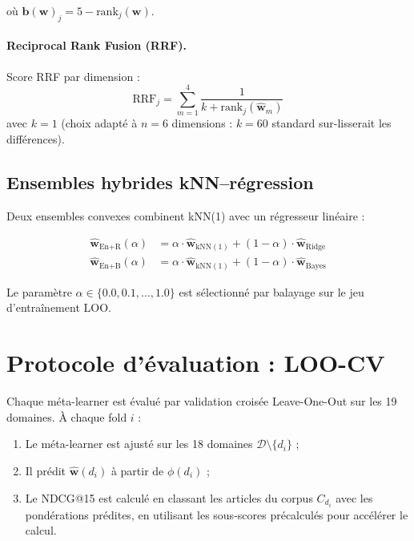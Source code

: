 où $\mathbf{b}(\mathbf{w})_j = 5 - \text{rank}_j(\mathbf{w})$.

\paragraph{Reciprocal Rank Fusion (RRF).} Score RRF par dimension :
\begin{equation}
  \text{RRF}_j = \sum_{m=1}^{4} \frac{1}{k + \text{rank}_j(\hat{\mathbf{w}}_m)}
  \label{eq:rrf}
\end{equation}
avec $k = 1$ (choix adapté à $n = 6$ dimensions : $k = 60$ standard
sur-lisserait les différences).

\subsection{Ensembles hybrides kNN--régression}

Deux ensembles convexes combinent kNN(1) avec un régresseur linéaire :

\begin{align}
  \hat{\mathbf{w}}_{\text{En+R}}(\alpha) &= \alpha \cdot \hat{\mathbf{w}}_{\text{kNN}(1)}
    + (1 - \alpha) \cdot \hat{\mathbf{w}}_{\text{Ridge}} \\
  \hat{\mathbf{w}}_{\text{En+B}}(\alpha) &= \alpha \cdot \hat{\mathbf{w}}_{\text{kNN}(1)}
    + (1 - \alpha) \cdot \hat{\mathbf{w}}_{\text{Bayes}}
\end{align}

Le paramètre $\alpha \in \{0.0, 0.1, \ldots, 1.0\}$ est sélectionné par
balayage sur le jeu d'entraînement LOO.

\section{Protocole d'évaluation : LOO-CV}

Chaque méta-learner est évalué par validation croisée Leave-One-Out sur
les 19 domaines. À chaque fold $i$ :
\begin{enumerate}
  \item Le méta-learner est ajusté sur les 18 domaines $\mathcal{D} \setminus \{d_i\}$ ;
  \item Il prédit $\hat{\mathbf{w}}(d_i)$ à partir de $\phi(d_i)$ ;
  \item Le NDCG@15 est calculé en classant les articles du corpus $C_{d_i}$
    avec les pondérations prédites, en utilisant les sous-scores précalculés
    pour accélérer le calcul.
\end{enumerate}

